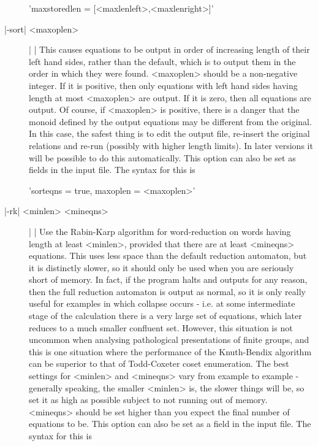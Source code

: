 \begin{description}
'maxstoredlen \:= [<maxlenleft>,<maxlenright>]'
\item[|-sort| <maxoplen>] | |\newline
This causes equations to be output in order of increasing length of their
left hand sides, rather than the default, which is to output them in the
order in which they were found. <maxoplen> should be a non-negative integer.
If it is positive, then only equations with left hand sides having length
at most <maxoplen> are output. If it is zero, then all equations are output.
Of course, if <maxoplen> is positive, there is a danger that the monoid
defined by the output equations may be different from the original.
In this case, the safest thing is to edit the output file,
re-insert the original relations and re-run (possibly with higher length
limits). In later versions it will be possible to do this automatically.
This option can also be set as fields in the input file.
The syntax for this is

'sorteqns \:= true, maxoplen \:= <maxoplen>'
\item[|-rk| <minlen> <mineqns>] | |\newline
Use the Rabin-Karp algorithm for word-reduction on words having length at least
<minlen>, provided that there are at least <mineqns> equations.
This uses less space than the default reduction automaton, but it is
distinctly slower, so it should only be used when you are seriously short of
memory.
In fact, if the program halts and outputs for any reason, then
the full reduction automaton is output as normal, so it is only really
useful for examples in which collapse occurs - i.e. at some intermediate
stage of the calculation there is a very large set of equations, which later
reduces to a much smaller confluent set. However, this situation is not
uncommon when analysing pathological presentations of finite groups, and
this is one situation where the performance of the Knuth-Bendix algorithm can
be superior to that of Todd-Coxeter coset enumeration.
The best settings for <minlen> and <mineqns> vary from example to
example - generally speaking, the smaller <minlen> is, the slower things
will be, so set it as high as possible subject to not running out of memory.
<mineqns> should be set higher than you expect the final number of
equations to be.
This option can also be set as a field in the input file.
The syntax for this is


\end{description}
